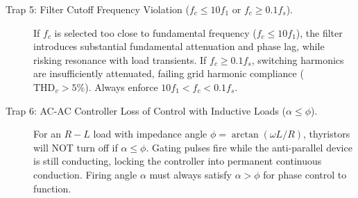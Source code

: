 \begin{center}
{{\begin{description}
  \item[Trap 5: Filter Cutoff Frequency Violation ($f_c \le 10 f_1$ or $f_c \ge 0.1 f_s$).]
  If $f_c$ is selected too close to fundamental frequency ($f_c \le 10 f_1$), the filter introduces substantial fundamental attenuation and phase lag, while risking resonance with load transients. If $f_c \ge 0.1 f_s$, switching harmonics are insufficiently attenuated, failing grid harmonic compliance ($\mathrm{THD}_v > 5\%$). Always enforce $10 f_1 < f_c < 0.1 f_s$.

  \item[Trap 6: AC-AC Controller Loss of Control with Inductive Loads ($\alpha \le \phi$).]
  For an $R-L$ load with impedance angle $\phi = \arctan(\omega L / R)$, thyristors will NOT turn off if $\alpha \le \phi$. Gating pulses fire while the anti-parallel device is still conducting, locking the controller into permanent continuous conduction. Firing angle $\alpha$ must always satisfy $\alpha > \phi$ for phase control to function.
\end{description}
}}
\end{center}
